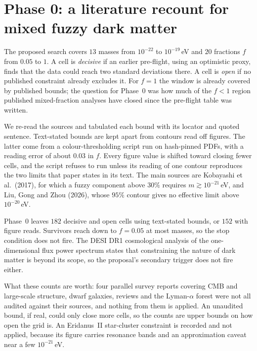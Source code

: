 \documentclass[11pt,a4paper]{article}
\begin{document}
\section{Phase 0: a literature recount for mixed fuzzy dark matter}\label{sec:p0}

The proposed search covers $13$ masses from $10^{-22}$ to $10^{-19}$\,eV and $20$ fractions $f$ from $0.05$ to
$1$. A cell is \emph{decisive} if an earlier pre-flight, using an optimistic proxy, finds that the data could
reach two standard deviations there. A cell is \emph{open} if no published constraint already excludes it. For
$f=1$ the window is already covered by published bounds; the question for Phase~0 was how much of the $f<1$
region published mixed-fraction analyses have closed since the pre-flight table was written.

We re-read the sources and tabulated each bound with its locator and quoted sentence. Text-stated bounds are
kept apart from contours read off figures. The latter come from a colour-thresholding script run on
hash-pinned PDFs, with a reading error of about $0.03$ in $f$. Every figure value is shifted toward closing
fewer cells, and the script refuses to run unless its reading of one contour reproduces the two limits that
paper states in its text. The main sources are Kobayashi et al.\ (2017), for which a fuzzy component above $30\%$
requires $m\gtrsim10^{-21}$\,eV, and Liu, Gong and Zhou (2026), whose $95\%$ contour gives no effective limit
above $10^{-20}$\,eV.

\begin{table}[h]
\centering\small

\caption{Phase~0 recount. ``Decisive'' is the pre-flight's optimistic proxy, not a forecast. The stop
condition fires if fewer than $10$ cells survive or if all survivors have $f\ge0.5$.}\label{tab:p0}
\end{table}

\begin{headlinebox}
Phase~0 leaves $182$ decisive and open cells using text-stated bounds, or $152$ with figure reads. Survivors
reach down to $f=0.05$ at most masses, so the stop condition does not fire. The DESI DR1 cosmological analysis
of the one-dimensional flux power spectrum states that constraining the nature of dark matter is beyond its
scope, so the proposal's secondary trigger does not fire either.
\end{headlinebox}

What these counts are worth: four parallel survey reports covering CMB and large-scale structure, dwarf
galaxies, reviews and the Lyman-$\alpha$ forest were not all audited against their sources, and nothing from
them is applied. An unaudited bound, if real, could only close more cells, so the counts are upper bounds on
how open the grid is. An Eridanus~II star-cluster constraint is recorded and not applied, because its figure
carries resonance bands and an approximation caveat near a few $10^{-21}$\,eV.
\end{document}
